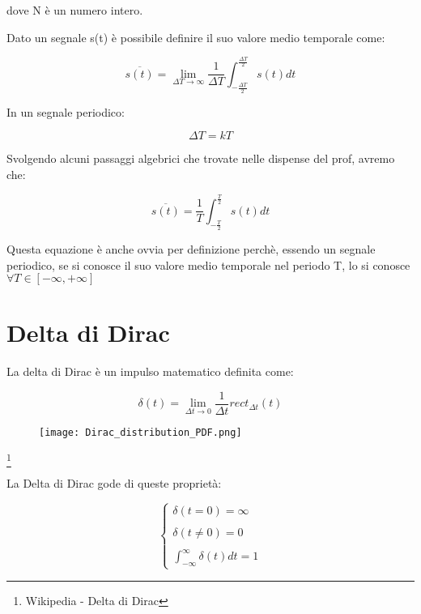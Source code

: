 dove N è un numero intero. \newline 


Dato un segnale s(t) è possibile definire il suo valore medio temporale come: 

{
    \Large 
    \begin{equation}
        \overline{s(t)} 
        = 
        \lim_{\Delta T \rightarrow \infty} 
        \frac{1}{\Delta T}
        \int_{- \frac{\Delta T}{2} }^{\frac{\Delta T}{2} } 
        s(t) dt
    \end{equation}
}

In un segnale periodico: 

{
    \Large
    \begin{equation}
        \Delta T = kT
    \end{equation}
} 

Svolgendo alcuni passaggi algebrici che trovate nelle dispense del prof, avremo che: 


{
    \Large 
    \begin{equation}
        \overline{s (t)}
        = 
        \frac{1}{T} \int_{-\frac{T}{2}}^{\frac{T}{2}} 
        s(t) dt
    \end{equation}
}

Questa equazione è anche ovvia per definizione perchè, essendo un segnale periodico, se si conosce 
il suo valore medio temporale nel periodo T, lo si conosce $\forall T \in [-\infty, +\infty]$

\newpage 

\section{Delta di Dirac} 

La delta di Dirac è un impulso matematico definita come: 

{
    \Large 
    \begin{equation}
        \delta (t) 
        = 
        \lim_{\Delta t \rightarrow 0} 
        \frac{1}{\Delta t} rect_{\Delta t} (t)
    \end{equation}
}

\begin{figure}[h]
    \centering
    \texttt{[image: Dirac\_distribution\_PDF.png]}
\end{figure}  

\footnote{Wikipedia - Delta di Dirac}

La Delta di Dirac gode di queste proprietà: 

{
    \Large 
    \begin{equation}
        \begin{cases}
            \delta (t = 0) = \infty \\ \\
            \delta (t \not = 0) = 0 \\ \\
            \int_{- \infty}^{ \infty} \delta (t) dt = 1
        \end{cases}
    \end{equation}
}

